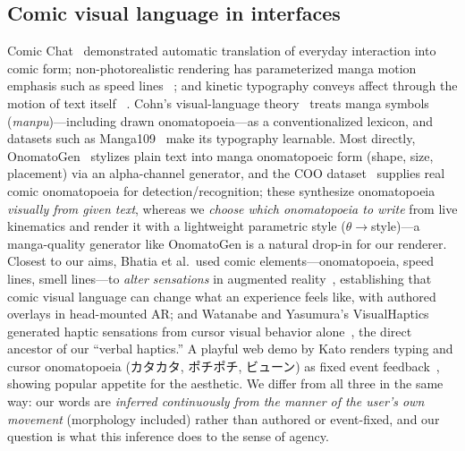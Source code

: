\documentclass[sigconf,nonacm]{acmart}
\newcommand{\jp}[1]{#1}
\begin{document}
\subsection{Comic visual language in interfaces}
Comic Chat~\cite{kurlander1996comic} demonstrated automatic translation of everyday interaction into comic form; non-photorealistic rendering has parameterized manga motion emphasis such as speed lines ~\cite{kawagishi2003cartoon}; and kinetic typography conveys affect through the motion of text itself ~\cite{forlizzi2003kinedit}. Cohn's visual-language theory~\cite{cohn2013} treats manga symbols (\emph{manpu})---including drawn onomatopoeia---as a conventionalized lexicon, and datasets such as Manga109~\cite{matsui2017manga109} make its typography learnable. Most directly, OnomatoGen~\cite{taniguchi2025onomatogen} stylizes plain text into manga onomatopoeic form (shape, size, placement) via an alpha-channel generator, and the COO dataset~\cite{baek2022coo} supplies real comic onomatopoeia for detection/recognition; these synthesize onomatopoeia \emph{visually from given text}, whereas we \emph{choose which onomatopoeia to write} from live kinematics and render it with a lightweight parametric style ($\theta\to$style)---a manga-quality generator like OnomatoGen is a natural drop-in for our renderer. Closest to our aims, Bhatia et al.\ used comic elements---onomatopoeia, speed lines, smell lines---to \emph{alter sensations} in augmented reality~\cite{bhatia2024comics}, establishing that comic visual language can change what an experience feels like, with authored overlays in head-mounted AR; and Watanabe and Yasumura's VisualHaptics generated haptic sensations from cursor visual behavior alone~\cite{watanabe2008visualhaptics}, the direct ancestor of our ``verbal haptics.'' A playful web demo by Kato renders typing and cursor onomatopoeia (\jp{カタカタ}, \jp{ポチポチ}, \jp{ビューン}) as fixed event feedback~\cite{katokatakata}, showing popular appetite for the aesthetic. We differ from all three in the same way: our words are \emph{inferred continuously from the manner of the user's own movement} (morphology included) rather than authored or event-fixed, and our question is what this inference does to the sense of agency.
\end{document}
